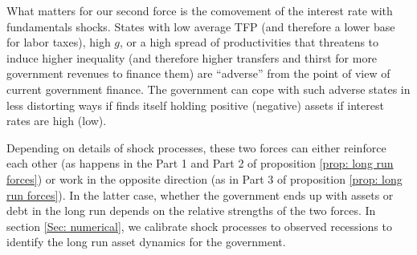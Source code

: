 \documentclass[thmsb,11pt]{article}
\begin{document}
{ What matters for our second force is the comovement of the interest rate with fundamentals shocks. States with low average TFP (and therefore a lower base for labor taxes), high $g$, or a high spread of productivities that threatens to induce higher inequality (and therefore higher  transfers and thirst for more  government  revenues to finance them) are ``adverse'' from the point of view of current government finance.
 The government can cope with such adverse states in less distorting ways if finds itself holding positive (negative) assets if interest rates are  high (low).


Depending on  details of shock processes, these two forces can
either reinforce each other (as happens in the Part 1 and Part 2 %
 of  proposition \ref{prop: long run forces}) or work in the opposite direction (as in Part 3 of  proposition \ref{prop: long run forces}). In the latter case, whether the
government ends up with assets or debt in the long run depends on the
relative strengths of the two forces. In section \ref{Sec: numerical},  we
calibrate shock processes to observed recessions to identify the long run asset
dynamics for the government.

}
\end{document}
